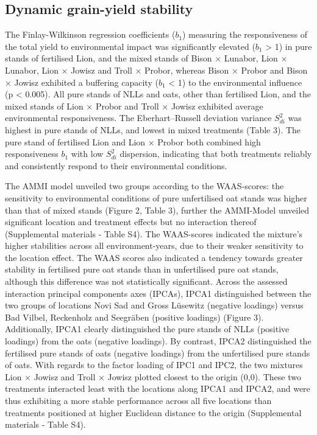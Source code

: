 \documentclass[
  british,
  a4paper,
  DIV=11,
  numbers=noendperiod]{scrreprt}
\begin{document}
\subsection{Dynamic grain-yield
stability}\label{dynamic-grain-yield-stability-1}

The Finlay-Wilkinson regression coefficients (\(b_{1}\)) measuring the
responsiveness of the total yield to environmental impact was
significantly elevated (\(b_{1}\) \textgreater{} 1) in pure stands of
fertilised Lion, and the mixed stands of Bison × Lunabor, Lion ×
Lunabor, Lion × Jowisz and Troll × Probor, whereas Bison × Probor and
Bison × Jowisz exhibited a buffering capacity (\(b_{1}\) \textless{} 1)
to the environmental influence (p \textless{} 0.005). All pure stands of
NLLs and oats, other than fertilised Lion, and the mixed stands of Lion
× Probor and Troll × Jowisz exhibited average environmental
responsiveness. The Eberhart--Russell deviation variance \(S^2_{di}\)
was highest in pure stands of NLLs, and lowest in mixed treatments
(Table 3). The pure stand of fertilised Lion and Lion × Probor both
combined high responsiveness \(b_{1}\) with low \(S^2_{di}\) dispersion,
indicating that both treatments reliably and consistently respond to
their environmental conditions.

The AMMI model unveiled two groups according to the WAAS-scores: the
sensitivity to environmental conditions of pure unfertilised oat stands
was higher than that of mixed stands (Figure 2, Table 3), further the
AMMI-Model unveiled significant location and treatment effects but no
interaction thereof (Supplemental materials - Table S4). The WAAS-scores
indicated the mixture's higher stabilities across all environment-years,
due to their weaker sensitivity to the location effect. The WAAS scores
also indicated a tendency towards greater stability in fertilised pure
oat stands than in unfertilised pure oat stands, although this
difference was not statistically significant. Across the assessed
interaction principal components axes (IPCAs), IPCA1 distinguished
between the two groups of locations Novi Sad and Gross Lüsewitz
(negative loadings) versus Bad Vilbel, Reckenholz and Seegräben
(positive loadings) (Figure 3). Additionally, IPCA1 clearly
distinguished the pure stands of NLLs (positive loadings) from the oats
(negative loadings). By contrast, IPCA2 distinguished the fertilised
pure stands of oats (negative loadings) from the unfertilised pure
stands of oats. With regards to the factor loading of IPC1 and IPC2, the
two mixtures Lion × Jowisz and Troll × Jowisz plotted closest to the
origin (0,0). These two treatments interacted least with the locations
along IPCA1 and IPCA2, and were thus exhibiting a more stable
performance across all five locations than treatments positioned at
higher Euclidean distance to the origin (Supplemental materials - Table
S4).
\end{document}
